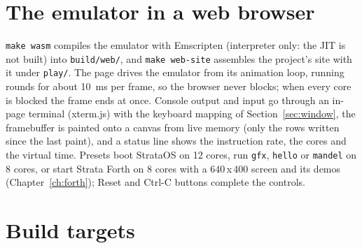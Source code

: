 \section{The emulator in a web browser}\label{sec:web}

\texttt{make wasm} compiles the emulator with Emscripten (interpreter only: the JIT is not built) into
\texttt{build/web/}, and \texttt{make web-site} assembles the project's site with it under
\texttt{play/}. The page drives the emulator from its animation loop, running rounds for about 10~ms
per frame, so the browser never blocks; when every core is blocked the frame ends at once. Console
output and input go through an in-page terminal (xterm.js) with the keyboard mapping of
Section~\ref{sec:window}, the framebuffer is painted onto a canvas from live memory (only the rows
written since the last paint), and a status line shows the instruction rate, the cores and the virtual
time. Presets boot StrataOS on 12 cores, run \texttt{gfx}, \texttt{hello} or \texttt{mandel} on 8
cores, or start Strata Forth on 8 cores with a 640\,x\,400 screen and its demos
(Chapter~\ref{ch:forth}); Reset and Ctrl-C buttons complete the controls.

\section{Build targets}

